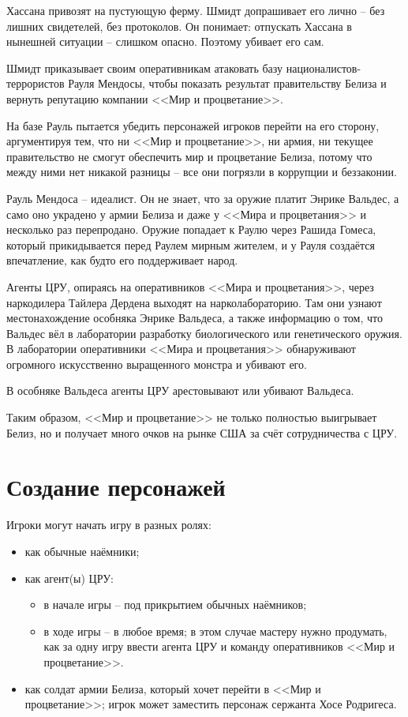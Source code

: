 \documentclass{article}
\begin{document}
Хассана привозят на пустующую ферму. Шмидт допрашивает его лично -- без
лишних свидетелей, без протоколов. Он понимает: отпускать Хассана в
нынешней ситуации -- слишком опасно. Поэтому убивает его сам.

Шмидт приказывает своим оперативникам атаковать базу
националистов-террористов Рауля Мендосы, чтобы показать результат
правительству Белиза и вернуть репутацию компании <<Мир и процветание>>.

На базе Рауль пытается убедить персонажей игроков перейти на его
сторону, аргументируя тем, что ни <<Мир и процветание>>, ни армия, ни
текущее правительство не смогут обеспечить мир и процветание Белиза,
потому что между ними нет никакой разницы -- все они погрязли в
коррупции и беззаконии.

Рауль Мендоса -- идеалист. Он не знает, что за оружие платит Энрике
Вальдес, а само оно украдено у армии Белиза и даже у <<Мира и
процветания>> и несколько раз перепродано. Оружие попадает к Раулю через
Рашида Гомеса, который прикидывается перед Раулем мирным жителем, и у
Рауля создаётся впечатление, как будто его поддерживает народ.

Агенты ЦРУ, опираясь на оперативников <<Мира и процветания>>, через
наркодилера Тайлера Дердена выходят на нарколабораторию. Там они узнают
местонахождение особняка Энрике Вальдеса, а также информацию о том, что
Вальдес вёл в лаборатории разработку биологического или генетического
оружия. В лаборатории оперативники <<Мира и процветания>> обнаруживают
огромного искусственно выращенного монстра и убивают его.

В особняке Вальдеса агенты ЦРУ арестовывают или убивают Вальдеса.

Таким образом, <<Мир и процветание>> не только полностью выигрывает Белиз,
но и получает много очков на рынке США за счёт сотрудничества с ЦРУ.

\section{Создание
персонажей}\label{char-creation}

Игроки могут начать игру в разных ролях:

\begin{itemize}
\item
  как обычные наёмники;
\item
  как агент(ы) ЦРУ:

  \begin{itemize}
  \item
    в начале игры -- под прикрытием обычных наёмников;
  \item
    в ходе игры -- в любое время; в этом случае мастеру нужно продумать,
    как за одну игру ввести агента ЦРУ и команду оперативников <<Мир и
    процветание>>.
  \end{itemize}
\item
  как солдат армии Белиза, который хочет перейти в <<Мир и процветание>>;
  игрок может заместить персонаж сержанта Хосе Родригеса.
\end{itemize}
\end{document}

